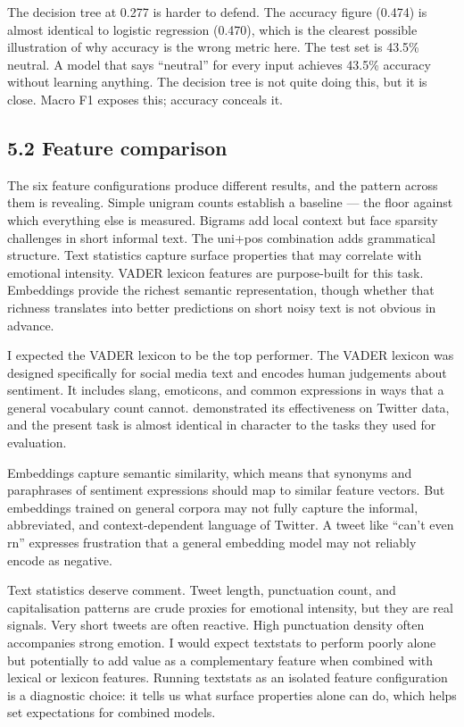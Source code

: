 \documentclass[12pt]{article}
\begin{document}
The decision tree at 0.277 is harder to defend. The accuracy figure (0.474) is almost identical to logistic regression (0.470), which is the clearest possible illustration of why accuracy is the wrong metric here. The test set is 43.5\% neutral. A model that says ``neutral'' for every input achieves 43.5\% accuracy without learning anything. The decision tree is not quite doing this, but it is close. Macro F1 exposes this; accuracy conceals it.

\subsection*{5.2 Feature comparison}

The six feature configurations produce different results, and the pattern across them is revealing. Simple unigram counts establish a baseline --- the floor against which everything else is measured. Bigrams add local context but face sparsity challenges in short informal text. The uni+pos combination adds grammatical structure. Text statistics capture surface properties that may correlate with emotional intensity. VADER lexicon features are purpose-built for this task. Embeddings provide the richest semantic representation, though whether that richness translates into better predictions on short noisy text is not obvious in advance.

I expected the VADER lexicon to be the top performer. The VADER lexicon was designed specifically for social media text and encodes human judgements about sentiment. It includes slang, emoticons, and common expressions in ways that a general vocabulary count cannot. \citet{hutto2014vader} demonstrated its effectiveness on Twitter data, and the present task is almost identical in character to the tasks they used for evaluation.

Embeddings capture semantic similarity, which means that synonyms and paraphrases of sentiment expressions should map to similar feature vectors. But embeddings trained on general corpora may not fully capture the informal, abbreviated, and context-dependent language of Twitter. A tweet like ``can't even rn'' expresses frustration that a general embedding model may not reliably encode as negative.

Text statistics deserve comment. Tweet length, punctuation count, and capitalisation patterns are crude proxies for emotional intensity, but they are real signals. Very short tweets are often reactive. High punctuation density often accompanies strong emotion. I would expect textstats to perform poorly alone but potentially to add value as a complementary feature when combined with lexical or lexicon features. Running textstats as an isolated feature configuration is a diagnostic choice: it tells us what surface properties alone can do, which helps set expectations for combined models.
\end{document}
